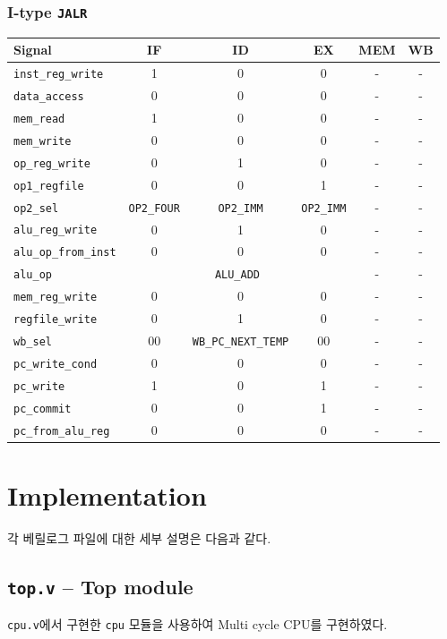 \documentclass{scrartcl}
\begin{document}
\subsubsection{I-type \texttt{JALR}}
\begin{tabularx}{\textwidth}{ | X | c | c | c | c | c | }
  \hline
  \textbf{Signal} & \textbf{IF} & \textbf{ID} & \textbf{EX} & \textbf{MEM} & \textbf{WB} \\ \hline
  \texttt{inst\_reg\_write} & 1 & 0 & 0 & - & - \\ \hline
  \texttt{data\_access} & 0 & 0 & 0 & - & - \\ \hline
  \texttt{mem\_read} & 1 & 0 & 0 & - & - \\ \hline
  \texttt{mem\_write} & 0 & 0 & 0 & - & - \\ \hline
  \texttt{op\_reg\_write} & 0 & 1 & 0 & - & - \\ \hline
  \texttt{op1\_regfile} & 0 & 0 & 1 & - & - \\ \hline
  \texttt{op2\_sel} & \texttt{OP2\_FOUR} & \texttt{OP2\_IMM} & \texttt{OP2\_IMM} & - & - \\ \hline
  \texttt{alu\_reg\_write} & 0 & 1 & 0 & - & - \\ \hline
  \texttt{alu\_op\_from\_inst} & 0 & 0 & 0 & - & - \\ \hline
  \texttt{alu\_op} & \multicolumn{3}{c|}{\texttt{ALU\_ADD}} & - & - \\ \hline
  \texttt{mem\_reg\_write} & 0 & 0 & 0 & - & - \\ \hline
  \texttt{regfile\_write} & 0 & 1 & 0 & - & - \\ \hline
  \texttt{wb\_sel} & 00 & \texttt{WB\_PC\_NEXT\_TEMP} & 00 & - & - \\ \hline
  \texttt{pc\_write\_cond} & 0 & 0 & 0 & - & - \\ \hline
  \texttt{pc\_write} & 1 & 0 & 1 & - & - \\ \hline
  \texttt{pc\_commit} & 0 & 0 & 1 & - & - \\ \hline
  \texttt{pc\_from\_alu\_reg} & 0 & 0 & 0 & - & - \\ \hline
\end{tabularx}

\section{Implementation}
각 베릴로그 파일에 대한 세부 설명은 다음과 같다.

\subsection{\texttt{top.v} -- Top module}
\texttt{cpu.v}에서 구현한 \texttt{cpu} 모듈을 사용하여 Multi cycle CPU를 구현하였다.
\end{document}
